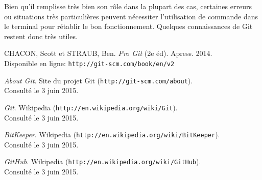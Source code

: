 \documentclass[11pt,a4paper]{article}
\begin{document}
Bien qu'il remplisse très bien son rôle dans la plupart des cas, certaines erreurs ou situations très particulières peuvent nécessiter l'utilisation de commande dans le terminal pour rétablir le bon fonctionnement.
Quelques connaissances de Git restent donc très utiles.

\pagebreak
\begin{thebibliography}{1}

	CHACON, Scott et STRAUB, Ben. {\em Pro Git} (2e éd). Apress. 2014. \\
	Disponible en ligne: {\tt http://git-scm.com/book/en/v2}

	{\em About Git}. Site du projet Git ({\tt http://git-scm.com/about}). \\
	Consulté le 3 juin 2015.

	{\em Git}. Wikipedia ({\tt http://en.wikipedia.org/wiki/Git}). \\
	Consulté le 3 juin 2015.

	{\em BitKeeper}. Wikipedia ({\tt http://en.wikipedia.org/wiki/BitKeeper}). \\
	Consulté le 3 juin 2015.

	{\em GitHub}. Wikipedia ({\tt http://en.wikipedia.org/wiki/GitHub}). \\
	Consulté le 3 juin 2015.
	
\end{thebibliography}
\end{document}
